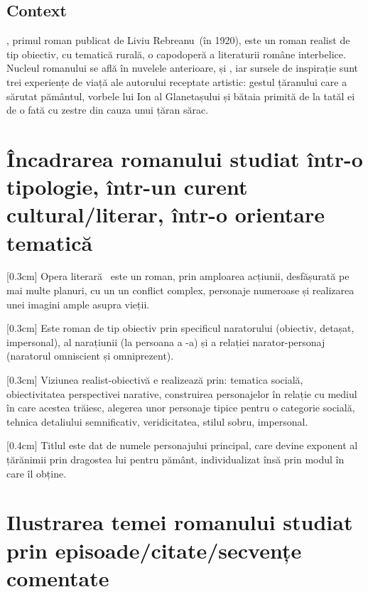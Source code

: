 \renewcommand{\operatitle}{\textbfit{„Ion”}} %
\renewcommand{\operaauthor}{Liviu Rebreanu} %


\subsection{Context}

\operatitle, primul roman publicat de \operaauthor\ (în 1920), este un roman realist de tip obiectiv, cu tematică rurală, o capodoperă a literaturii române interbelice. Nucleul romanului se află în nuvelele anterioare,  și , iar sursele de inspirație sunt trei experiențe de viață ale autorului receptate artistic: gestul țăranului care a sărutat pământul, vorbele lui Ion al Glanetașului și bătaia primită de la tatăl ei de o fată cu zestre din cauza unui țăran sărac.


\section{Încadrarea romanului studiat într-o tipologie, într-un curent cultural/literar, într-o orientare tematică}

[0.3cm]
Opera literară \operatitle\ este un roman, prin amploarea acțiunii, desfășurată pe mai multe planuri, cu un un conflict complex, personaje numeroase și realizarea unei imagini ample asupra vieții.

[0.3cm]
Este roman de tip obiectiv prin specificul naratorului (obiectiv, detașat, impersonal), al narațiunii (la persoana a -a) și a relației narator-personaj (naratorul omniscient și omniprezent).

[0.3cm]
Viziunea realist-obiectivă e realizează prin: tematica socială, obiectivitatea perspectivei narative, construirea personajelor în relație cu mediul în care acestea trăiesc, alegerea unor personaje tipice pentru o categorie socială, tehnica detaliului semnificativ, veridicitatea, stilul sobru, impersonal.

[0.4cm]
Titlul este dat de numele personajului principal, care devine exponent al țărănimii prin dragostea lui pentru pământ, individualizat însă prin modul în care îl obține.


\section{Ilustrarea temei romanului studiat prin episoade/citate/sec\-ven\-țe comentate}

